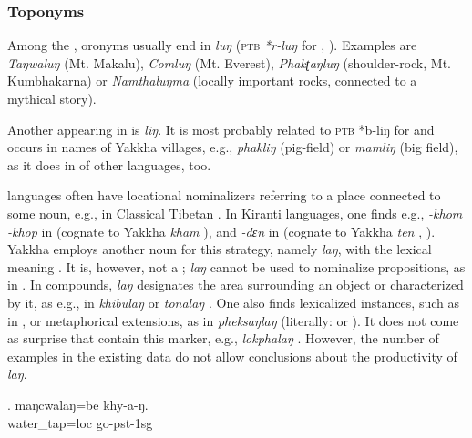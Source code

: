  
\subsubsection{Toponyms}
 
Among the , oronyms usually end in \emph{luŋ} (\textsc{ptb} \emph{*r-luŋ} for , \citealt[50]{Matisoff2003Handbook}). Examples are \emph{Taŋwaluŋ} (Mt. Makalu), \emph{Comluŋ} (Mt. Everest), \emph{Phakʈaŋluŋ}  (shoulder-rock, Mt. Kumbhakarna) or \emph{Namthaluŋma} (locally important rocks, connected to a mythical story).

Another  appearing in  is \emph{liŋ}. It  is most probably related to \textsc{ptb} *b-liŋ for   \citep[280]{Matisoff2003Handbook} and occurs in names of Yakkha villages, e.g., \emph{phakliŋ} (pig-field) or \emph{mamliŋ}  (big field), as it does in  of other  languages, too.

 languages often have locational nominalizers referring to a place connected to some noun, e.g., in Classical Tibetan \citep[300]{Beyer1992_Tibetan}. In Kiranti languages, one finds e.g., \emph{-khom \ti -khop} in  (cognate to Yakkha \emph{kham} ), and \emph{-dɛn} in  (cognate to Yakkha \emph{ten} , \citealt[89]{Ebert1994The-structure}). Yakkha  employs another noun for this strategy, namely \emph{laŋ}, with the lexical meaning . It is, however, not a ;  \emph{laŋ} cannot be used to nominalize propositions, as in . In compounds, \emph{laŋ} designates the area surrounding an object or characterized by it, as e.g., in \emph{khibulaŋ}  or \emph{tonalaŋ} . One also finds lexicalized instances, such as in \Next, or metaphorical extensions, as in \emph{pheksaŋlaŋ}  (literally:  or ). It does not come as surprise that  contain this marker, e.g., \emph{lokphalaŋ} . However, the number of examples in the existing data do not allow conclusions about the productivity of \emph{laŋ}. 

\exg. maŋcwalaŋ=be khy-a-ŋ.\\
water\_tap{\sc =loc} go{\sc -pst-1sg}\\
  

